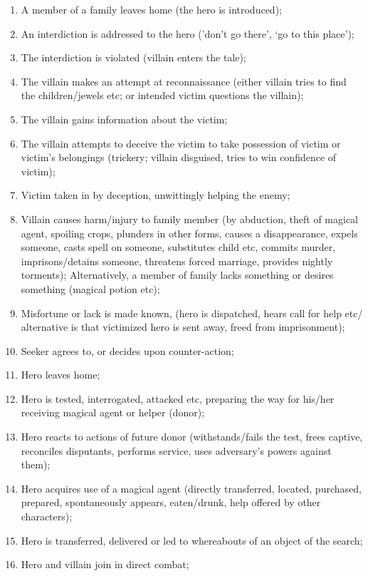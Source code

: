 \documentclass[10pt,a4paper]{article}
\begin{document}
\begin{enumerate}

	\item  A member of a family leaves home (the hero is introduced);
 	\item  An interdiction is addressed to the hero (’don’t go there’, ‘go to
this place’);
	\item  The interdiction is violated (villain enters the tale);
	\item  The villain makes an attempt at reconnaissance (either villain
tries to find the children/jewels etc; or intended victim questions
the villain);
 	\item  The villain gains information about the victim;
 	\item  The villain attempts to deceive the victim to take possession of
victim or victim’s belongings (trickery; villain disguised, tries to win
confidence of victim);
 	\item  Victim taken in by deception, unwittingly helping the enemy;
 	\item  Villain causes harm/injury to family member (by abduction,
theft of magical agent, spoiling crops, plunders in other forms,
causes a disappearance, expels someone, casts spell on someone,
substitutes child etc, commits murder, imprisons/detains someone,
threatens forced marriage, provides nightly torments); Alternatively,
a member of family lacks something or desires something (magical
potion etc);
 	\item  Misfortune or lack is made known, (hero is dispatched, hears
call for help etc/ alternative is that victimized hero is sent away,
freed from imprisonment);
 	\item  Seeker agrees to, or decides upon counter-action;
	\item  Hero leaves home;
 	\item  Hero is tested, interrogated, attacked etc, preparing the way
for his/her receiving magical agent or helper (donor);
 	\item  Hero reacts to actions of future donor (withstands/fails the
test, frees captive, reconciles disputants, performs service, uses
adversary’s powers against them);
 \item  Hero acquires use of a magical agent (directly transferred,
located, purchased, prepared, spontaneously appears, eaten/drunk,
help offered by other characters);
 \item  Hero is transferred, delivered or led to whereabouts of an
object of the search;
	\item  Hero and villain join in direct combat;

\end{enumerate}
\end{document}
